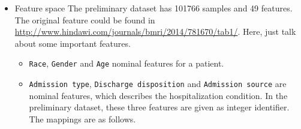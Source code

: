 \documentclass[]{article}
\begin{document}
\begin{itemize}
\item
  Feature space The preliminary dataset has 101766 samples and 49
  features. The original feature could be found in
  \url{http://www.hindawi.com/journals/bmri/2014/781670/tab1/}. Here,
  just talk about some important features.

  \begin{itemize}
  \itemsep1pt\parskip0pt
  \item
    \texttt{Race}, \texttt{Gender} and \texttt{Age} nominal features for
    a patient.
  \item
    \texttt{Admission type}, \texttt{Discharge disposition} and
    \texttt{Admission source} are nominal features, which describes the
    hospitalization condition. In the preliminary dataset, these three
    features are given as integer identifier. The mappings are as
    follows.
  \end{itemize}


\end{itemize}
\end{document}
